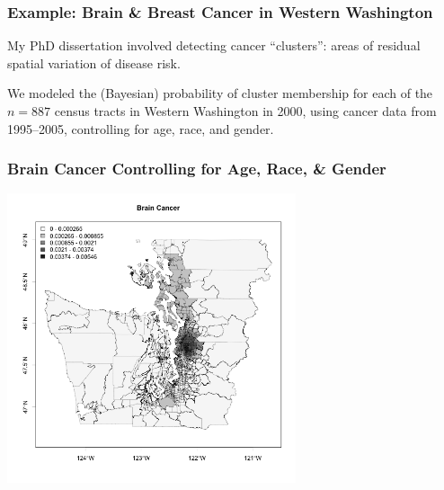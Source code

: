 \documentclass[slides]{beamer}
\begin{document}
\begin{frame}[fragile]
\frametitle{Example: Brain \& Breast Cancer in Western Washington}

My PhD dissertation involved detecting cancer ``clusters'': areas of residual spatial variation of disease risk.

\vspace{1cm}

We modeled the (Bayesian) probability of cluster membership for each of the $n=887$ census tracts in Western Washington in 2000, using cancer data from 1995--2005, controlling for age, race, and gender.  




\end{frame}


\begin{frame}[fragile]
\frametitle{Brain Cancer Controlling for Age, Race, \& Gender}
\begin{center}
\includegraphics[width=8.5cm]{figure/brain.png}
\end{center}
\end{frame}
\end{document}
